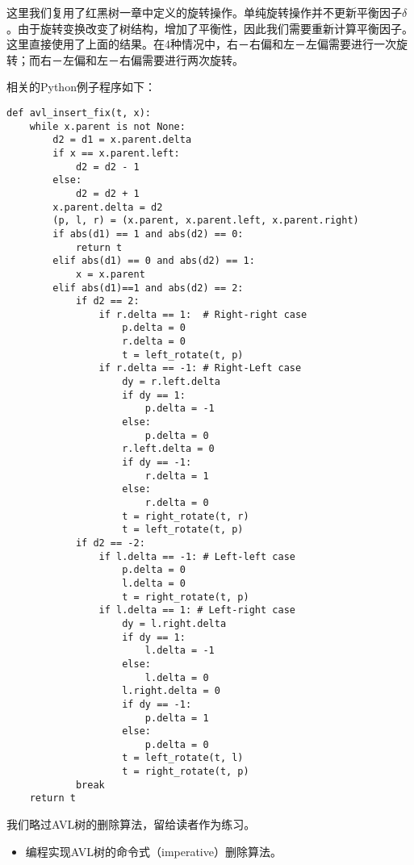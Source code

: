 \documentclass[UTF8]{article}
\begin{document}
这里我们复用了红黑树一章中定义的旋转操作。单纯旋转操作并不更新平衡因子$\delta$。由于旋转变换改变了树结构，增加了平衡性，因此我们需要重新计算平衡因子。这里直接使用了上面的结果。在4种情况中，右－右偏和左－左偏需要进行一次旋转；而右－左偏和左－右偏需要进行两次旋转。

相关的Python例子程序如下：

\begin{lstlisting}
def avl_insert_fix(t, x):
    while x.parent is not None:
        d2 = d1 = x.parent.delta
        if x == x.parent.left:
            d2 = d2 - 1
        else:
            d2 = d2 + 1
        x.parent.delta = d2
        (p, l, r) = (x.parent, x.parent.left, x.parent.right)
        if abs(d1) == 1 and abs(d2) == 0:
            return t
        elif abs(d1) == 0 and abs(d2) == 1:
            x = x.parent
        elif abs(d1)==1 and abs(d2) == 2:
            if d2 == 2:
                if r.delta == 1:  # Right-right case
                    p.delta = 0
                    r.delta = 0
                    t = left_rotate(t, p)
                if r.delta == -1: # Right-Left case
                    dy = r.left.delta
                    if dy == 1:
                        p.delta = -1
                    else:
                        p.delta = 0
                    r.left.delta = 0
                    if dy == -1:
                        r.delta = 1
                    else:
                        r.delta = 0
                    t = right_rotate(t, r)
                    t = left_rotate(t, p)
            if d2 == -2:
                if l.delta == -1: # Left-left case
                    p.delta = 0
                    l.delta = 0
                    t = right_rotate(t, p)
                if l.delta == 1: # Left-right case
                    dy = l.right.delta
                    if dy == 1:
                        l.delta = -1
                    else:
                        l.delta = 0
                    l.right.delta = 0
                    if dy == -1:
                        p.delta = 1
                    else:
                        p.delta = 0
                    t = left_rotate(t, l)
                    t = right_rotate(t, p)
            break
    return t
\end{lstlisting}

我们略过AVL树的删除算法，留给读者作为练习。

\begin{Exercise}

\begin{itemize}
\item 编程实现AVL树的命令式（imperative）删除算法。
\end{itemize}

\end{Exercise}
\end{document}
